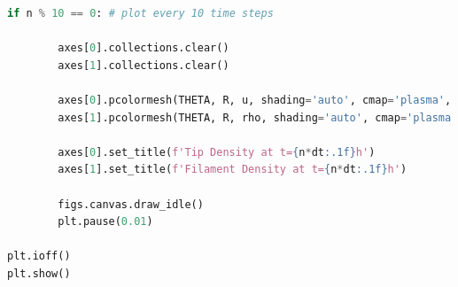 \documentclass{article}
\begin{document}
\begin{lstlisting}[language=Python, caption=Tip and Filament Density (with Branching and Anastomosis) Code]
    if n % 10 == 0: # plot every 10 time steps

        axes[0].collections.clear()
        axes[1].collections.clear()
        
        axes[0].pcolormesh(THETA, R, u, shading='auto', cmap='plasma', vmin=0, vmax=K)
        axes[1].pcolormesh(THETA, R, rho, shading='auto', cmap='plasma', vmin=0, vmax=1.5)
        
        axes[0].set_title(f'Tip Density at t={n*dt:.1f}h')
        axes[1].set_title(f'Filament Density at t={n*dt:.1f}h')

        figs.canvas.draw_idle()
        plt.pause(0.01)

plt.ioff()
plt.show()
\end{lstlisting}
\end{document}
